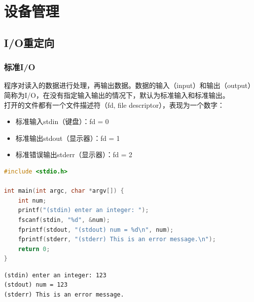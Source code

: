 \chapter{设备管理}

\section{I/O重定向}

\subsection{标准I/O}

程序对读入的数据进行处理，再输出数据。数据的输入（input）和输出（output）简称为I/O，在没有指定输入输出的情况下，默认为标准输入和标准输出。\\

打开的文件都有一个文件描述符（fd, file descriptor），表现为一个数字：

\begin{itemize}
    \item 标准输入stdin（键盘）：fd = 0
    \item 标准输出stdout（显示器）：fd = 1
    \item 标准错误输出stderr（显示器）：fd = 2
\end{itemize}

\vspace{0.5cm}


\begin{lstlisting}[language=C]
#include <stdio.h>

int main(int argc, char *argv[]) {
    int num;
    printf("(stdin) enter an integer: ");
    fscanf(stdin, "%d", &num);
    fprintf(stdout, "(stdout) num = %d\n", num);
    fprintf(stderr, "(stderr) This is an error message.\n");
    return 0;
}
\end{lstlisting}

\begin{tcolorbox}
    \begin{verbatim}
(stdin) enter an integer: 123
(stdout) num = 123
(stderr) This is an error message.
	\end{verbatim}
\end{tcolorbox}

\vspace{0.5cm}


